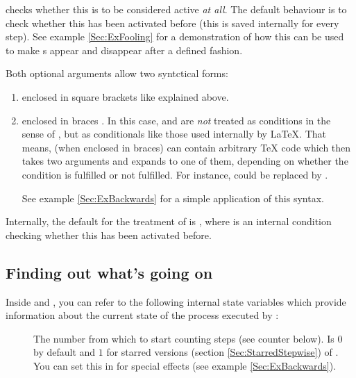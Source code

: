 \begin{slide}
   checks whether this  is to be considered active \emph{at all}. The default
  behaviour is to check whether this  has been activated before (this is saved internally for every
  step). See example \ref{Sec:ExFooling} for a demonstration of how this can be used to make s appear
  and disappear after a defined fashion.

  Both optional arguments allow two syntctical forms:
  \begin{enumerate}
  \item enclosed in square brackets \code{[]} like explained above.
  \item enclosed in braces \code{()}. In this case,  and  are \emph{not} treated as
    conditions in the sense of , but as conditionals like those used internally by \LaTeX. That
    means,  (when enclosed in braces) can contain arbitrary \TeX{} code which then takes two
    arguments and expands to one of them, depending on whether the condition is fulfilled or not fulfilled. For
    instance,  could be replaced by
    .

    See example \ref{Sec:ExBackwards} for a simple application of this syntax.
  \end{enumerate}

  Internally, the default for the treatment of  is , where
   is an internal condition checking whether this  has been activated before.

  \newslide

  \subsection{Finding out what's going on}\label{Sec:Internals}%
  Inside  and , you can refer to the following internal state variables which provide
  information about the current state of the process executed by :
  \begin{description}
  \item[]
    The number from which to start counting steps (see counter 
    below). Is $0$ by default and $1$ for starred versions (section \ref{Sec:StarredStepwise}) of .
    You can set this in  for special effects (see example \ref{Sec:ExBackwards}).


\end{description}
\end{slide}
